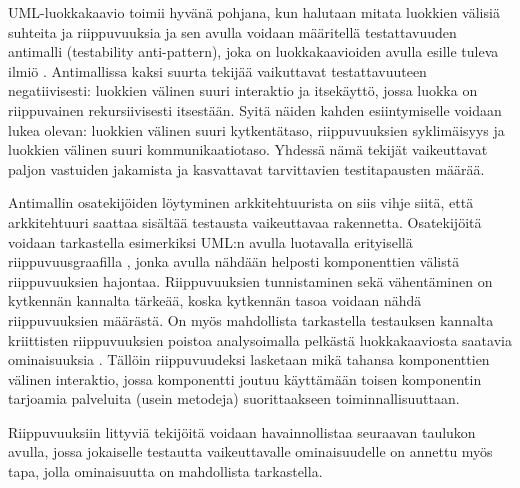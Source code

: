\documentclass[finnish]{tktltiki2}
\numberwithin{table}{section}
\theoremstyle{definition}
\theoremstyle{remark}
\begin{document}
UML-luokkakaavio toimii hyvänä pohjana, kun halutaan mitata luokkien välisiä suhteita ja riippuvuuksia \citep{baudry_testability_2002} ja sen avulla voidaan määritellä testattavuuden antimalli (testability anti-pattern), joka on luokkakaavioiden avulla esille tuleva ilmiö \citep{baudry_measuring_2003}. Antimallissa kaksi suurta tekijää vaikuttavat testattavuuteen negatiivisesti: luokkien välinen suuri interaktio ja itsekäyttö, jossa luokka on riippuvainen rekursiivisesti itsestään. Syitä näiden kahden esiintymiselle voidaan lukea olevan: luokkien välinen suuri kytkentätaso, riippuvuuksien syklimäisyys ja luokkien välinen suuri kommunikaatiotaso. Yhdessä nämä tekijät vaikeuttavat paljon vastuiden jakamista ja kasvattavat tarvittavien testitapausten määrää. 

Antimallin osatekijöiden löytyminen arkkitehtuurista on siis vihje siitä, että arkkitehtuuri saattaa sisältää testausta vaikeuttavaa rakennetta. Osatekijöitä voidaan tarkastella esimerkiksi UML:n avulla luotavalla erityisellä riippuvuusgraafilla \citep{baudry_testability_2002}, jonka avulla nähdään helposti komponenttien välistä riippuvuuksien hajontaa. Riippuvuuksien tunnistaminen sekä vähentäminen on kytkennän kannalta tärkeää, koska kytkennän tasoa voidaan nähdä riippuvuuksien määrästä.  On myös mahdollista tarkastella testauksen kannalta kriittisten riippuvuuksien poistoa analysoimalla pelkästä luokkakaaviosta saatavia ominaisuuksia \citep{Jungmayr:2002}. Tällöin riippuvuudeksi lasketaan mikä tahansa komponenttien välinen interaktio, jossa komponentti joutuu käyttämään toisen komponentin tarjoamia palveluita (usein metodeja) suorittaakseen toiminnallisuuttaan. 

Riippuvuuksiin littyviä tekijöitä voidaan havainnollistaa seuraavan taulukon avulla, jossa jokaiselle testautta vaikeuttavalle ominaisuudelle on annettu myös tapa, jolla ominaisuutta on mahdollista tarkastella.
\end{document}
